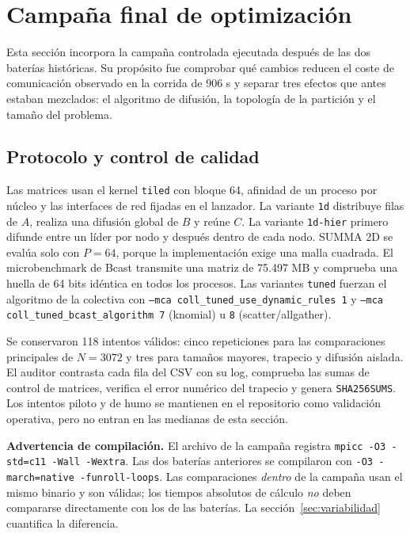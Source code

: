 \section{Campaña final de optimización}\label{sec:opt}

Esta sección incorpora la campaña controlada ejecutada después de las dos baterías históricas. Su propósito fue comprobar qué cambios reducen el coste de comunicación observado en la corrida de 906 s y separar tres efectos que antes estaban mezclados: el algoritmo de difusión, la topología de la partición y el tamaño del problema.

\subsection{Protocolo y control de calidad}

Las matrices usan el kernel \texttt{tiled} con bloque 64, afinidad de un proceso por núcleo y las interfaces de red fijadas en el lanzador. La variante \texttt{1d} distribuye filas de $A$, realiza una difusión global de $B$ y reúne $C$. La variante \texttt{1d-hier} primero difunde entre un líder por nodo y después dentro de cada nodo. SUMMA 2D se evalúa solo con $P=64$, porque la implementación exige una malla cuadrada. El microbenchmark de Bcast transmite una matriz de 75.497 MB y comprueba una huella de 64 bits idéntica en todos los procesos. Las variantes \texttt{tuned} fuerzan el algoritmo de la colectiva con \texttt{--mca coll\_tuned\_use\_dynamic\_rules 1} y \texttt{--mca coll\_tuned\_bcast\_algorithm 7} (knomial) u \texttt{8} (scatter/allgather).

Se conservaron 118 intentos válidos: cinco repeticiones para las comparaciones principales de $N=3072$ y tres para tamaños mayores, trapecio y difusión aislada. El auditor contrasta cada fila del CSV con su log, comprueba las sumas de control de matrices, verifica el error numérico del trapecio y genera \texttt{SHA256SUMS}. Los intentos piloto y de humo se mantienen en el repositorio como validación operativa, pero no entran en las medianas de esta sección.

\begin{idea}
\textbf{Advertencia de compilación.} El archivo  de la campaña registra \texttt{mpicc -O3 -std=c11 -Wall -Wextra}. Las dos baterías anteriores se compilaron con \texttt{-O3 -march=native -funroll-loops}. Las comparaciones \emph{dentro} de la campaña usan el mismo binario y son válidas; los tiempos absolutos de cálculo \emph{no} deben compararse directamente con los de las baterías. La sección~\ref{sec:variabilidad} cuantifica la diferencia.
\end{idea}

